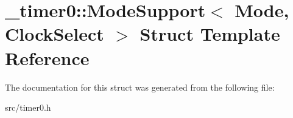 \hypertarget{struct__timer0_1_1ModeSupport}{}\section{\+\_\+timer0\+:\+:Mode\+Support$<$ Mode, Clock\+Select $>$ Struct Template Reference}
\label{struct__timer0_1_1ModeSupport}


The documentation for this struct was generated from the following file\+:\begin{DoxyCompactItemize}
\item 
src/timer0.\+h\end{DoxyCompactItemize}
